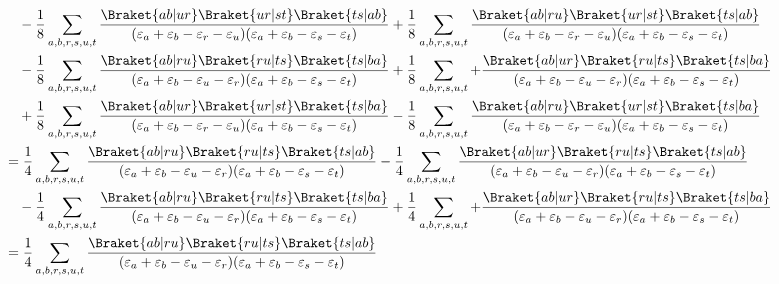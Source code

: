 \documentclass[a4paper]{article}
\begin{document}
\begin{align}
&\quad{} - \dfrac{1}{8} \sum_{a,b,r,s,u,t} \dfrac{\Braket{ab|ur} \Braket{ur|st} \Braket{ts|ab}}{(\varepsilon_a + \varepsilon_b - \varepsilon_r - \varepsilon_u)(\varepsilon_a + \varepsilon_b - \varepsilon_s - \varepsilon_t)} 
+ \dfrac{1}{8} \sum_{a,b,r,s,u,t} \dfrac{\Braket{ab|ru} \Braket{ur|st} \Braket{ts|ab}}{(\varepsilon_a + \varepsilon_b - \varepsilon_r - \varepsilon_u)(\varepsilon_a + \varepsilon_b - \varepsilon_s - \varepsilon_t)} 
\notag\\
&\quad{} - \dfrac{1}{8} \sum_{a,b,r,s,u,t} \dfrac{\Braket{ab|ru} \Braket{ru|ts} \Braket{ts|ba}}{(\varepsilon_a + \varepsilon_b - \varepsilon_u - \varepsilon_r)(\varepsilon_a + \varepsilon_b - \varepsilon_s - \varepsilon_t)} 
+ \dfrac{1}{8} \sum_{a,b,r,s,u,t} + \dfrac{\Braket{ab|ur} \Braket{ru|ts} \Braket{ts|ba}}{(\varepsilon_a + \varepsilon_b - \varepsilon_u - \varepsilon_r)(\varepsilon_a + \varepsilon_b - \varepsilon_s - \varepsilon_t)} \notag\\
&\quad{} + \dfrac{1}{8} \sum_{a,b,r,s,u,t} \dfrac{\Braket{ab|ur} \Braket{ur|st} \Braket{ts|ba}}{(\varepsilon_a + \varepsilon_b - \varepsilon_r - \varepsilon_u)(\varepsilon_a + \varepsilon_b - \varepsilon_s - \varepsilon_t)} 
- \dfrac{1}{8} \sum_{a,b,r,s,u,t} \dfrac{\Braket{ab|ru} \Braket{ur|st} \Braket{ts|ba}}{(\varepsilon_a + \varepsilon_b - \varepsilon_r - \varepsilon_u)(\varepsilon_a + \varepsilon_b - \varepsilon_s - \varepsilon_t)}  \notag\\
&= \dfrac{1}{4} \sum_{a,b,r,s,u,t} \dfrac{\Braket{ab|ru} \Braket{ru|ts} \Braket{ts|ab}}{(\varepsilon_a + \varepsilon_b - \varepsilon_u - \varepsilon_r)(\varepsilon_a + \varepsilon_b - \varepsilon_s - \varepsilon_t)} 
- \dfrac{1}{4} \sum_{a,b,r,s,u,t} \dfrac{\Braket{ab|ur} \Braket{ru|ts} \Braket{ts|ab}}{(\varepsilon_a + \varepsilon_b - \varepsilon_u - \varepsilon_r)(\varepsilon_a + \varepsilon_b - \varepsilon_s - \varepsilon_t)} \notag\\
&\quad{} - \dfrac{1}{4} \sum_{a,b,r,s,u,t} \dfrac{\Braket{ab|ru} \Braket{ru|ts} \Braket{ts|ba}}{(\varepsilon_a + \varepsilon_b - \varepsilon_u - \varepsilon_r)(\varepsilon_a + \varepsilon_b - \varepsilon_s - \varepsilon_t)} 
+ \dfrac{1}{4} \sum_{a,b,r,s,u,t} + \dfrac{\Braket{ab|ur} \Braket{ru|ts} \Braket{ts|ba}}{(\varepsilon_a + \varepsilon_b - \varepsilon_u - \varepsilon_r)(\varepsilon_a + \varepsilon_b - \varepsilon_s - \varepsilon_t)} \notag\\
&= \dfrac{1}{4} \sum_{a,b,r,s,u,t} \dfrac{\Braket{ab|ru} \Braket{ru|ts} \Braket{ts|ab}}{(\varepsilon_a + \varepsilon_b - \varepsilon_u - \varepsilon_r)(\varepsilon_a + \varepsilon_b - \varepsilon_s - \varepsilon_t)} 

\end{align}
\end{document}
